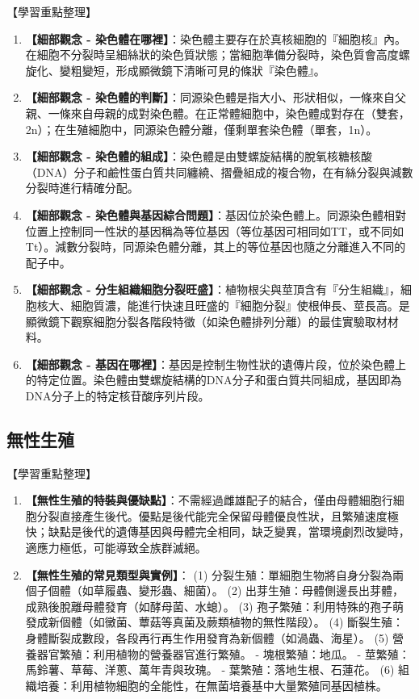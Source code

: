 \documentclass[11pt,a4paper]{article}
\begin{document}
\begin{learningpoints}{【學習重點整理】}
\begin{enumerate}[label=\arabic*.]
  \item \textbf{【細部觀念 - 染色體在哪裡】}：染色體主要存在於真核細胞的『細胞核』內。在細胞不分裂時呈細絲狀的染色質狀態；當細胞準備分裂時，染色質會高度螺旋化、變粗變短，形成顯微鏡下清晰可見的條狀『染色體』。
  \item \textbf{【細部觀念 - 染色體的判斷】}：同源染色體是指大小、形狀相似，一條來自父親、一條來自母親的成對染色體。在正常體細胞中，染色體成對存在（雙套，2n）；在生殖細胞中，同源染色體分離，僅剩單套染色體（單套，1n）。
  \item \textbf{【細部觀念 - 染色體的組成】}：染色體是由雙螺旋結構的脫氧核糖核酸（DNA）分子和鹼性蛋白質共同纏繞、摺疊組成的複合物，在有絲分裂與減數分裂時進行精確分配。
  \item \textbf{【細部觀念 - 染色體與基因綜合問題】}：基因位於染色體上。同源染色體相對位置上控制同一性狀的基因稱為等位基因（等位基因可相同如TT，或不同如Tt）。減數分裂時，同源染色體分離，其上的等位基因也隨之分離進入不同的配子中。
  \item \textbf{【細部觀念 - 分生組織細胞分裂旺盛】}：植物根尖與莖頂含有『分生組織』，細胞核大、細胞質濃，能進行快速且旺盛的『細胞分裂』使根伸長、莖長高。是顯微鏡下觀察細胞分裂各階段特徵（如染色體排列分離）的最佳實驗取材材料。
  \item \textbf{【細部觀念 - 基因在哪裡】}：基因是控制生物性狀的遺傳片段，位於染色體上的特定位置。染色體由雙螺旋結構的DNA分子和蛋白質共同組成，基因即為DNA分子上的特定核苷酸序列片段。
\end{enumerate}
\end{learningpoints}

\subsection{無性生殖}
\begin{learningpoints}{【學習重點整理】}
\begin{enumerate}[label=\arabic*.]
  \item \textbf{【無性生殖的特裝與優缺點】}：不需經過雌雄配子的結合，僅由母體細胞行細胞分裂直接產生後代。優點是後代能完全保留母體優良性狀，且繁殖速度極快；缺點是後代的遺傳基因與母體完全相同，缺乏變異，當環境劇烈改變時，適應力極低，可能導致全族群滅絕。
  \item \textbf{【無性生殖的常見類型與實例】}：
  (1) 分裂生殖：單細胞生物將自身分裂為兩個子個體（如草履蟲、變形蟲、細菌）。
  (2) 出芽生殖：母體側邊長出芽體，成熟後脫離母體發育（如酵母菌、水螅）。
  (3) 孢子繁殖：利用特殊的孢子萌發成新個體（如黴菌、蕈菇等真菌及蕨類植物的無性階段）。
  (4) 斷裂生殖：身體斷裂成數段，各段再行再生作用發育為新個體（如渦蟲、海星）。
  (5) 營養器官繁殖：利用植物的營養器官進行繁殖。
     - 塊根繁殖：地瓜。
     - 莖繁殖：馬鈴薯、草莓、洋蔥、萬年青與玫瑰。
     - 葉繁殖：落地生根、石蓮花。
  (6) 組織培養：利用植物細胞的全能性，在無菌培養基中大量繁殖同基因植株。
\end{enumerate}
\end{learningpoints}
\end{document}
